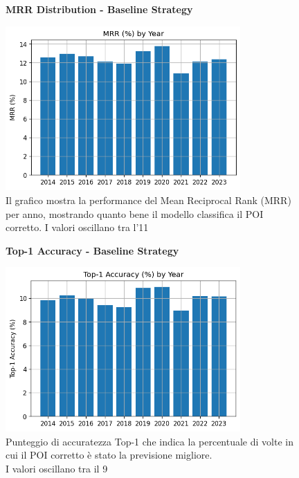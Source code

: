 \documentclass[12pt,a4paper]{article}
\begin{document}
\begin{enumerate}
\begin{figure}[H]
\centering
\textbf{MRR Distribution - Baseline Strategy}\par
\vspace{0.5em}
\includegraphics[width=0.8\textwidth]{../../img/no_SPACE-GEO_n-1_come_current_POI/mrr_distribution.png}
\caption{Il grafico mostra la performance del Mean Reciprocal Rank (MRR) per anno, mostrando quanto bene il modello classifica il POI corretto. I valori oscillano tra l'11%
}
\label{fig:baseline_mrr}
\end{figure}

\begin{figure}[H]
\centering
\textbf{Top-1 Accuracy - Baseline Strategy}\par
\vspace{0.5em}
\includegraphics[width=0.8\textwidth]{../../img/no_SPACE-GEO_n-1_come_current_POI/top1_accuracy.png}
\caption{Punteggio di accuratezza Top-1 che indica la percentuale di volte in cui il POI corretto è stato la previsione migliore.\\ I valori oscillano tra il 9%
}
\label{fig:baseline_top1}
\end{figure}


\end{enumerate}
\end{document}
